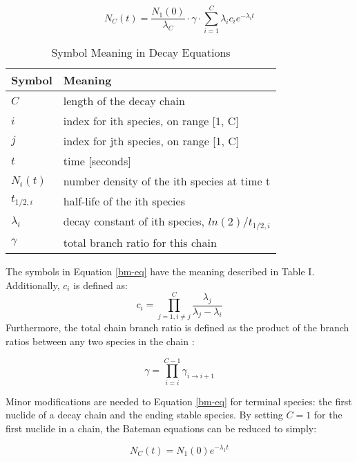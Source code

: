 \documentclass{anstrans}
\begin{document}
\begin{equation}
\label{bm-eq}
N_C(t) = \frac{N_1(0)}{\lambda_C} \cdot \gamma \cdot \sum_{i=1}^C \lambda_i c_{i} e^{-\lambda_i t}
\end{equation}

\begin{table}[hbt]
\label{decay-symbol-meaning}
\caption{Symbol Meaning in Decay Equations}
\begin{tabular}{|l|l|}
\hline
\textbf{Symbol} & \textbf{Meaning} \\
\hline
$C$         & length of the decay chain\\
$i$         & index for ith species, on range [1, C]\\
$j$         & index for jth species, on range [1, C]\\
$t$         & time [seconds]\\
$N_i(t)$    & number density of the ith species at time t\\
$t_{1/2,i}$ & half-life of the ith species\\
$\lambda_i$ & decay constant of ith species, $ln(2)/t_{1/2,i}$\\
$\gamma$    & total branch ratio for this chain\\
\hline
\end{tabular}
\end{table}

The symbols in Equation \ref{bm-eq} have the meaning described in Table I.
Additionally, $c_{i}$ is defined as:
\begin{equation}
\label{c_i}
c_i = \prod_{j=1,i\ne j}^C \frac{\lambda_j}{\lambda_j - \lambda_i}
\end{equation}
Furthermore, the total chain branch ratio is defined as the product of the 
branch ratios between any two species in the chain \cite{harr2007precise}:

\begin{equation}
\label{gamma}
\gamma = \prod_{i=i}^{C-1} \gamma_{i \to i+1}
\end{equation}

Minor modifications are needed to Equation \ref{bm-eq} for terminal species: 
the first nuclide of a decay chain and the ending stable species. By setting 
$C=1$ for the first nuclide in a chain, the Bateman equations can be reduced 
to simply:%

\begin{equation}
\label{N_C}
N_C(t) = N_1(0) e^{-\lambda_1 t}
\end{equation}
\end{document}
